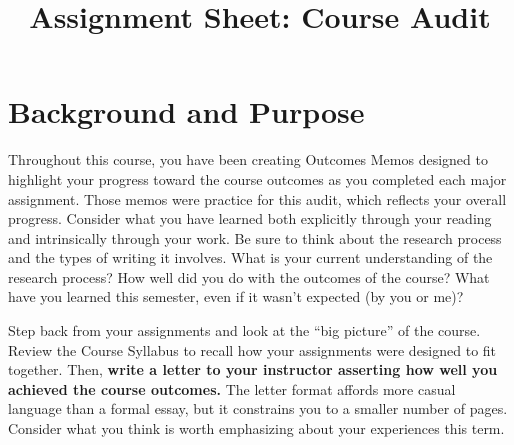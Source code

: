 \documentclass[9pt,twocolumn,oneside]{amsart}	%
\title[Course Audit]{Assignment Sheet: Course Audit}
\begin{document}
%
\thispagestyle{empty}
\setlength{\columnsep}{.25in}


\section{Background and Purpose} %
\label{sec:background}
Throughout this course, you have been creating Outcomes Memos designed to highlight your progress toward the course outcomes as you completed each major assignment. Those memos were practice for this audit, which reflects your overall progress. Consider what you have learned both explicitly through your reading and intrinsically through your work. Be sure to think about the research process and the types of writing it involves. What is your current understanding of the research process? How well did you do with the outcomes of the course? What have you learned this semester, even if it wasn't expected (by you or me)?

Step back from your assignments and look at the ``big picture'' of the course. Review the Course Syllabus to recall how your assignments were designed to fit together. Then, \textbf{write a letter to your instructor asserting how well you achieved the course outcomes.} The letter format affords more casual language than a formal essay, but it constrains you to a smaller number of pages. Consider what you think is worth emphasizing about your experiences this term.%
\end{document}
